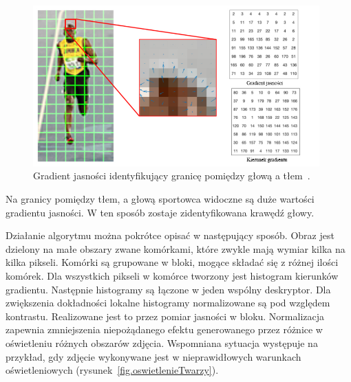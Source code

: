 \documentclass[a4paper,twoside,12pt]{book}
\begin{document}
    \begin{figure}
        \centering
        \includegraphics[width=11cm]{Obrazy/gradientJasnosciNaGlowie.jpg}
        \caption{Gradient jasności identyfikujący granicę pomiędzy głową a tłem~\cite{hogOpenCv}.}
        \label{fig.gradientJasnosciNaGlowie}
    \end{figure}
    Na granicy pomiędzy tłem, a głową sportowca widoczne są duże wartości gradientu jasności.
    W ten sposób zostaje zidentyfikowana krawędź głowy.

    Działanie algorytmu można pokrótce opisać w następujący sposób. Obraz jest dzielony na małe obszary zwane komórkami,
    które zwykle mają wymiar kilka na kilka pikseli. Komórki są grupowane w bloki, mogące składać się z różnej ilości
    komórek.
    Dla wszystkich pikseli w komórce tworzony jest histogram kierunków gradientu.
    Następnie histogramy są łączone w jeden wspólny deskryptor.
    Dla zwiększenia dokładności lokalne histogramy normalizowane są pod względem kontrastu.
    Realizowane jest to przez pomiar jasności w bloku. Normalizacja zapewnia zmniejszenia niepożądanego efektu
    generowanego przez
    różnice w oświetleniu różnych obszarów zdjęcia. Wspomniana sytuacja występuje na przykład, gdy zdjęcie wykonywane
    jest w nieprawidłowych warunkach oświetleniowych (rysunek~\ref{fig.oswietlenieTwarzy}).
\end{document}
